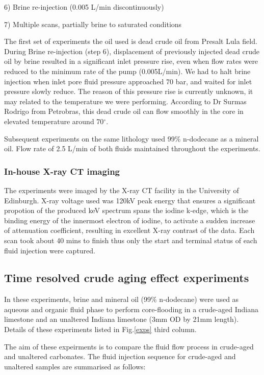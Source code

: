 6) Brine re-injection (0.005 \textmu L/min discontinuously)

7) Multiple scans, partially brine to saturated conditions

The first set of experiments the oil used is dead crude oil from Presalt Lula field. During Brine re-injection (step 6), displacement of previously injected dead crude oil by brine resulted in a significant inlet pressure rise, even when flow rates were reduced to the minimum rate of the pump (0.005\textmu L/min). We had to halt brine injection when inlet pore fluid pressure approached 70 bar, and waited for inlet pressure slowly reduce. The reason of this pressure rise is currently unknown, it may related to the temperature we were performing. According to Dr Surmas Rodrigo from Petrobras, this dead crude oil can flow smoothly in the core in elevated temperature around 70$^{\circ}$.

Subsequent experiments on the same lithology used 99\% n-dodecane as a mineral oil. Flow rate of 2.5 \textmu L/min of both fluids maintained throughout the experiments.

\subsubsection{In-house X-ray \textmu CT imaging}
The experiments were imaged by the X-ray \textmu CT facility in the University of Edinburgh. X-ray voltage used was 120kV peak energy that ensures a significant propotion of the produced keV spectrum spans the iodine k-edge, which is the binding energy of the innermost electron of iodine, to activate a sudden increase of attenuation coefficient, resulting in excellent X-ray contrast of the data. Each scan took about 40 mins to finish thus only the start and terminal status of each fluid injection were captured.

\subsection{Time resolved crude aging effect experiments}
In these experiments, brine and mineral oil (99\% n-dodecane) were used as aqueous and organic fluid phase to perform core-flooding in a crude-aged Indiana limestone and an unaltered Indiana limestone (3mm OD by 21mm length). Details of these experiments listed in Fig.\ref{exps} third column.

The aim of these expeirments is to compare the fluid flow process in crude-aged and unaltered carbonates. The fluid injection sequence for crude-aged and unaltered samples are summarised as follows:

